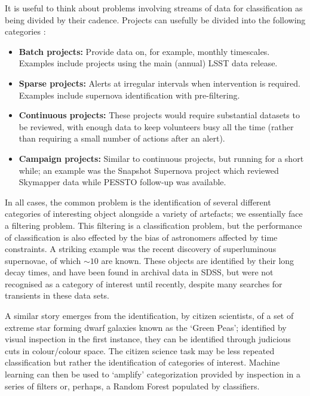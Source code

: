 \documentclass{pasa}
\begin{document}
It is useful to think about problems involving streams of data for classification as being divided by their cadence. Projects can usefully be divided into the following categories :

\begin{itemize}

\item \textbf{Batch projects:} Provide data on, for example, monthly timescales. Examples include projects using the main (annual) LSST data release.

\item \textbf{Sparse projects:} Alerts at irregular intervals when intervention is required. Examples include supernova identification with pre-filtering. 

\item \textbf{Continuous projects:} These projects would require substantial datasets to be reviewed, with enough data to keep volunteers busy all the time (rather than requiring a small number of actions after an alert). 

\item \textbf{Campaign projects:} Similar to continuous projects, but running for a short while; an example was the Snapshot Supernova project which reviewed Skymapper data while PESSTO follow-up was available. 

\end{itemize}

In all cases, the common problem is the identification of several different categories of interesting object alongside a variety of artefacts; we essentially face a filtering problem. This filtering is a classification problem, but the performance of classification is also effected by the bias of astronomers affected by time constraints. A striking example was the recent discovery of superluminous supernovae, of which $\sim 10$ are known. These objects are identified by their long decay times, and have been found in archival data in SDSS, but were not recognised as a category of interest until recently, despite many searches for transients in these data sets. 

A similar story emerges from the identification, by citizen scientists, of a set of extreme star forming dwarf galaxies known as the `Green Peas'; identified by visual inspection in the first instance, they can be identified through judicious cuts in colour/colour space. The citizen science task may be less repeated classification but rather the identification of categories of interest. Machine learning can then be used to `amplify' categorization provided by inspection in a series of filters or, perhaps, a Random Forest populated by classifiers. 
\end{document}

